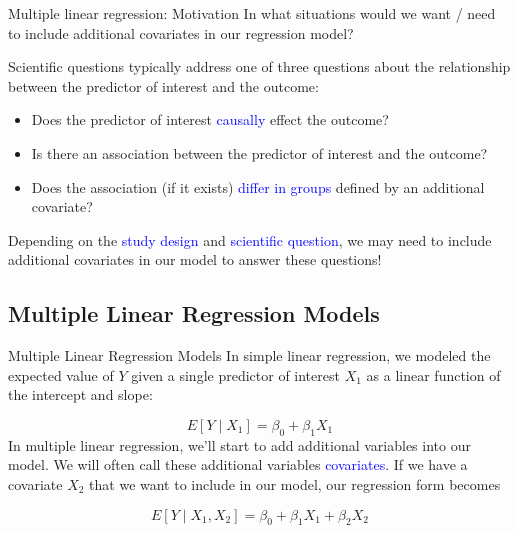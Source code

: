 \documentclass[10pt,t]{beamer}
\begin{document}
\begin{frame}{Multiple linear regression: Motivation}
	In what situations would we want / need to include additional covariates in our regression model?
	
	\vspace{0.3cm}
	
	Scientific questions typically address one of three questions about the relationship between the predictor of interest and the outcome:
	
	\vspace{0.3cm}
	
	\begin{itemize}
		\item Does the predictor of interest \textcolor{blue}{causally} effect the outcome?
		\item Is there an association between the predictor of interest and the outcome?
		\item Does the association (if it exists) \textcolor{blue}{differ in groups} defined by an additional covariate?
	\end{itemize} \pause
	
	\vspace{0.3cm}
	
	Depending on the \textcolor{blue}{study design} and \textcolor{blue}{scientific question}, we may need to include additional covariates in our model to answer these questions!
	
\end{frame}

\subsection{Multiple Linear Regression Models}

\begin{frame}{Multiple Linear Regression Models}
In simple linear regression, we modeled the expected value of $Y$ given a single predictor of interest $X_1$ as a linear function of the intercept and slope:

$$
E[Y \mid X_1] = \beta_0 + \beta_1 X_1
$$
\pause
In multiple linear regression, we'll start to add additional variables into our model. We will often call these additional variables \textcolor{blue}{covariates}. If we have a covariate $X_2$ that we want to include in our model, our regression form becomes

$$
E[Y \mid X_1, X_2] = \beta_0 + \beta_1 X_1 + \beta_2 X_2
$$

\end{frame}
\end{document}
